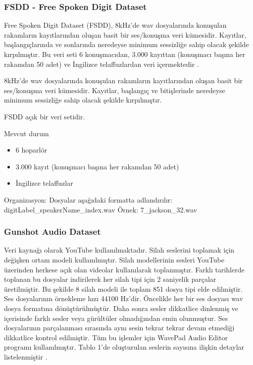 \documentclass[12pt, a4paper]{article}
\begin{document}
	\subsubsection{FSDD - Free Spoken Digit Dataset}
	Free Spoken Digit Dataset (FSDD), 8kHz'de wav dosyalarında konuşulan rakamların kayıtlarından oluşan basit bir ses/konuşma veri kümesidir. Kayıtlar, başlangıçlarında ve sonlarında neredeyse minimum sessizliğe sahip olacak şekilde kırpılmıştır. Bu veri seti 6 konuşmacıdan, 3.000 kayıttan (konuşmacı başına her rakamdan 50 adet) ve İngilizce telaffuzlardan veri içermektedir \cite{fsdd}.
	\vspace*{1\baselineskip}
	
	
	8kHz'de wav dosyalarında konuşulan rakamların kayıtlarından oluşan basit bir ses/konuşma veri kümesidir. Kayıtlar, başlangıç ve bitişlerinde neredeyse minimum sessizliğe sahip olacak şekilde kırpılmıştır.
	
	FSDD açık bir veri setidir.
	
	Mevcut durum
	\begin{itemize}
		\item 6 hoparlör
		\item 3.000 kayıt (konuşmacı başına her rakamdan 50 adet)
		\item  İngilizce telaffuzlar
	\end{itemize}
	
	
	Organizasyon:
	Dosyalar aşağıdaki formatta adlandırılır: \newline
	{digitLabel}\_{speakerName}\_{index}.wav \newline Örnek: 7\_jackson\_32.wav
	
	
	\vspace*{2\baselineskip}
	\subsubsection{Gunshot Audio Dataset}
	
	Veri kaynağı olarak YouTube kullanılmaktadır. Silah seslerini toplamak için değişken ortam modeli kullanılmıştır. Silah modellerinin sesleri YouTube üzerinden herkese açık olan videolar kullanılarak toplanmıştır. Farklı tarihlerde toplanan bu dosyalar indirilerek her silah tipi için 2 saniyelik parçalar üretilmiştir. Bu şekilde 8 silah modeli ile toplam 851 dosya tipi elde edilmiştir. Ses dosyalarının örnekleme hızı 44100 Hz'dir. Öncelikle her bir ses dosyası wav dosya formatına dönüştürülmüştür. Daha sonra sesler dikkatlice dinlenmiş ve içerisinde farklı sesler veya gürültüler olmadığından emin olunmuştur. Ses dosyalarının parçalanması sırasında aynı sesin tekrar tekrar devam etmediği dikkatlice kontrol edilmiştir. Tüm bu işlemler için WavePad Audio Editor programı kullanılmıştır. Tablo 1'de oluşturulan seslerin sayısına ilişkin detaylar listelenmiştir \cite{gunshot}.
	
\end{document}
